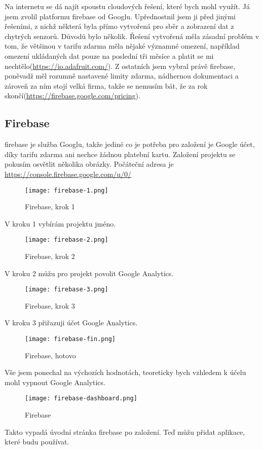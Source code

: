 Na internetu se dá najít spoustu cloudových řešení, které bych mohl využít. Já jsem zvolil platformu \gls{firebase} od 
Googlu. Upřednostnil jsem ji před jinými řešeními, z nichž některá byla přímo vytvořená pro sběr a zobrazení dat 
z chytrých senzorů. Důvodů bylo několik. Řešení vytvořená  měla zásadní problém v tom, že většinou v tarifu 
zdarma měla nějaké významné omezení, například omezení ukládaných dat pouze na poslední tři měsíce a platit se mi 
nechtělo(\url{https://io.adafruit.com/}). Z ostatních jsem vybral právě \gls{firebase}, poněvadž měl rozumně nastavené 
limity zdarma, nádhernou dokumentaci a zároveň za ním stojí velká firma, takže se nemusím bát, že za rok 
skončí(\url{https://firebase.google.com/pricing}).

\subsection{Firebase}
\gls{firebase} je služba Googlu, takže jediné co je potřeba pro založení je Google účet, díky tarifu zdarma ani nechce 
žádnou platební kartu. Založení projektu se pokusím osvětlit několika obrázky. Počáteční adresa je 
\url{https://console.firebase.google.com/u/0/}

\begin{figure}[H]
    \centering
    \texttt{[image: firebase-1.png]}
    \caption{Firebase, krok 1}
\end{figure}
V kroku 1 vybírám projektu jméno.
\begin{figure}[H]
    \centering
    \texttt{[image: firebase-2.png]}
    \caption{Firebase, krok 2}
\end{figure}
V kroku 2 můžu pro projekt povolit Google Analytics.
\begin{figure}[H]
    \centering
    \texttt{[image: firebase-3.png]}
    \caption{Firebase, krok 3}
\end{figure}
V kroku 3 přiřazuji účet Google Analytics.%
\begin{figure}[H]
    \centering
    \texttt{[image: firebase-fin.png]}
    \caption{Firebase, hotovo}
\end{figure}
Vše jsem ponechal na výchozích hodnotách, teoreticky bych vzhledem k účelu mohl vypnout Google Analytics.
\begin{figure}[H]
    \centering
    \texttt{[image: firebase-dashboard.png]}
    \caption{Firebase}
\end{figure}
Takto vypadá úvodní stránka \gls{firebase} po založení. Teď můžu přidat aplikace, které budu používat.

